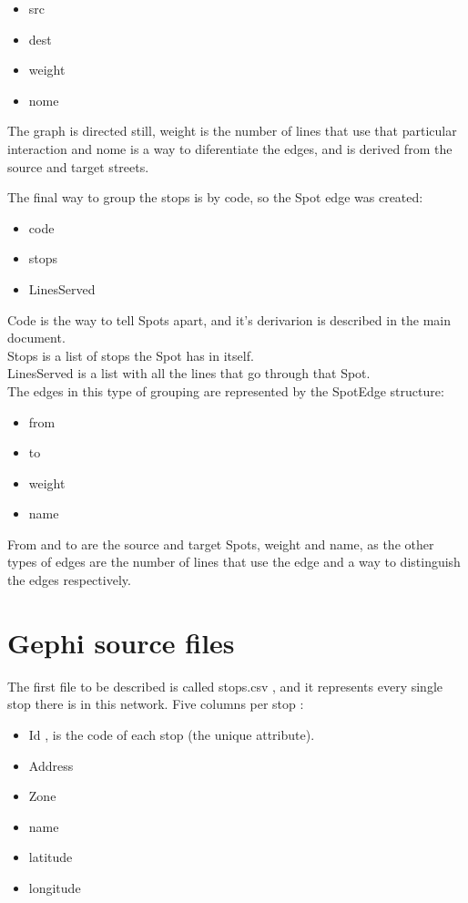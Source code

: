 \documentclass[12pt]{article}
\begin{document}
	\begin{itemize}
	\item src
	\item dest
	\item weight
	\item nome
	\end{itemize}
	
	The graph is directed still, weight is the number of lines that use that particular interaction and nome is a way to diferentiate the edges, and is derived from the source and target streets.
	
	The final way to group the stops is by code, so the Spot edge was created:
	
	\begin{itemize}
	\item code
	\item stops
	\item LinesServed
	\end{itemize}
	
Code is the way to tell Spots apart, and it's derivarion is described in the main document.\\
Stops is a list of stops the Spot has in itself.\\
LinesServed is a list with all the lines that go through that Spot.\\

The edges in this type of grouping are represented by the SpotEdge structure:
\begin{itemize}
\item from
\item to
\item weight
\item name
\end{itemize}

From and to are the source and target Spots, weight and name, as the other types of edges are the number of lines that use the edge and a way to distinguish the edges respectively.

\section{Gephi source files}

The first file to be described is called stops.csv , and it represents every single stop there is in this network. Five columns per stop :
	
	\begin{itemize}
		\item Id , is the code of each stop (the unique attribute).
		\item Address
		\item Zone
		\item name
		\item latitude
		\item longitude
	\end{itemize}
	
\end{document}
